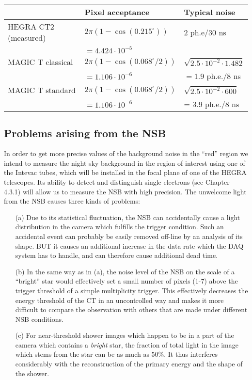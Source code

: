 \begin{center}
\begin{tabular}{|l|l|l|}
\hline
& Pixel acceptance & Typical noise \\ \hline\hline
HEGRA CT2 (measured) & $2\pi (1-\cos (0.215^{\circ }))$ & 2 ph.e/30 ns \\ 
& $=4.424\cdot 10^{-5}$ &  \\ \hline
MAGIC T classical & $2\pi (1-\cos (0.068^{\circ }/2))$ & $\sqrt{2.5\cdot
10^{-2}\cdot 1.482}$ \\ 
& $=1.106\cdot 10^{-6}$ & $=1.9$ ph.e./8 ns \\ \hline
MAGIC T standard & $2\pi (1-\cos (0.068^{\circ }/2))$ & $\sqrt{2.5\cdot
10^{-2}\cdot 600}$ \\ 
& $=1.106\cdot 10^{-6}$ & = 3.9 ph.e./8 ns \\ \hline
\end{tabular}
\end{center}

\subsection{Problems arising from the NSB}


\medskip In order to get more precise values of the background noise in the
``red'' region we intend to measure the night sky background in the region
of interest using one of the Intevac tubes, which will be installed in the
focal plane of one of the HEGRA telescopes. Its ability to detect and distinguish
single electrons (see Chapter 4.3.1) will allow us to measure the NSB with
high precision. The unwelcome light from the NSB causes three kinds of
problems:

\begin{itemize}
\item[(a)]  Due to its statistical fluctuation, the NSB can accidentally
cause a light distribution in the camera which fulfills the trigger
condition. Such an accidental event can probably be easily removed off-line
by an analysis of its shape. BUT it causes an additional increase in the
data rate which the DAQ system has to handle, and can therefore cause
additional dead time.

\item[(b)]  In the same way as in (a), the noise level of the NSB on the
scale of a ``bright'' star would effectively set a small number of pixels
(1-7) above the trigger threshold of a simple multiplicity trigger. This
effectively decreases the energy threshold of the CT in an uncontrolled way
and makes it more difficult to compare the observation with others that are
made under different NSB conditions.

\item[(c)]  For near-threshold shower images which happen to be in a part of
the camera which contains a {\em bright} star, the fraction of total light
in the image which stems from the star can be as much as 50\%. It thus
interferes considerably with the reconstruction of the primary energy and
the shape of the shower.
\end{itemize}


